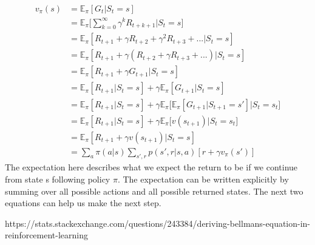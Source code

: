 \begin{align*}
	v_\pi(s) &= \mathbb{E}_\pi[G_t|S_t=s]\\
	& = \mathbb{E}_\pi\Bigg[\sum_{k=0}^{\infty}\gamma^k R_{t+k+1}\Big|S_t=s\Bigg]\\
	& = \mathbb{E}_\pi[R_{t+1} + \gamma R_{t+2} + \gamma^2 R_{t+3} + ...|S_t=s]\\
	& = \mathbb{E}_\pi[R_{t+1} + \gamma (R_{t+2} + \gamma R_{t+3} + ...)|S_t=s]\\
	& = \mathbb{E}_\pi[R_{t+1} + \gamma G_{t+1}|S_t=s]\\
	& = \mathbb{E}_\pi[R_{t+1}|S_t=s] + \gamma \mathbb{E}_\pi[ G_{t+1}|S_t=s]\\
	& = \mathbb{E}_\pi[R_{t+1}|S_t=s] + \gamma \mathbb{E}_\pi\Big[\mathbb{E}_\pi[ G_{t+1}|S_{t+1}=s']\Big|S_t = s_t\Big] \\
	& = \mathbb{E}_\pi[R_{t+1}|S_t=s] + \gamma \mathbb{E}_\pi\Big[v(s_{t+1})\Big|S_t = s_t\Big]\\
	& = \mathbb{E}_\pi[R_{t+1} + \gamma v(s_{t+1})|S_t=s]\\
	& = \sum_{a}\pi(a|s)\sum_{s',r}p(s',r|s,a)[r + \gamma v_\pi(s')]
\end{align*}
The expectation here describes what we expect the return to be if we continue from state s following policy $\pi$. The expectation can be written explicitly by summing over all possible actions and all possible returned states. The next two equations can help us make the next step.


https://stats.stackexchange.com/questions/243384/deriving-bellmans-equation-in-reinforcement-learning

